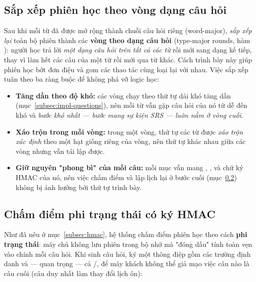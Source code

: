 \subsection{Sắp xếp phiên học theo vòng dạng câu hỏi}
\label{subsec:impl-rounds}

Sau khi mỗi từ đã được mở rộng thành chuỗi câu hỏi riêng (word-major),
 \textit{sắp xếp lại} toàn bộ phiên thành các \textbf{vòng
theo dạng câu hỏi} (type-major rounds, hàm ): người
học trả lời \textit{một dạng câu hỏi trên tất cả các từ} rồi mới sang dạng kế
tiếp, thay vì làm hết các câu của một từ rồi mới qua từ khác. Cách trình bày
này giúp phiên học bớt đơn điệu và gom các thao tác cùng loại lại với nhau.
Việc sắp xếp tuân theo ba ràng buộc để không phá vỡ logic học:

\begin{itemize}
  \item \textbf{Tăng dần theo độ khó:} các vòng chạy theo thứ tự dải khó tăng
        dần (mục~\ref{subsec:impl-questions}), nên mỗi từ vẫn gặp câu hỏi của
        nó từ dễ đến khó và \textit{bước khó nhất --- bước mang sự kiện SRS ---
        luôn nằm ở vòng cuối}.
  \item \textbf{Xáo trộn trong mỗi vòng:} trong một vòng, thứ tự các từ được
        \textit{xáo trộn xác định} theo một hạt giống riêng của vòng, nên thứ
        tự khác nhau giữa các vòng nhưng vẫn tái lập được.
  \item \textbf{Giữ nguyên "phong bì" của mỗi câu:} mỗi mục vẫn mang
        , ,  và chữ ký HMAC của
        nó, nên việc chấm điểm và lập lịch lại ở bước cuối
        (mục~\ref{subsec:impl-hmac}) không bị ảnh hưởng bởi thứ tự trình bày.
\end{itemize}

\subsection{Chấm điểm phi trạng thái có ký HMAC}
\label{subsec:impl-hmac}

Như đã nêu ở mục~\ref{subsec:hmac}, hệ thống chấm điểm phiên học theo cách
\textbf{phi trạng thái}: máy chủ không lưu phiên trong bộ nhớ mà "đóng dấu"
tính toàn vẹn vào chính mỗi câu hỏi. Khi sinh câu hỏi, 
ký một thông điệp gồm các trường định danh và --- quan trọng --- cả
/, để máy khách không thể giả mạo việc câu
nào là câu cuối (câu duy nhất làm thay đổi lịch ôn):

